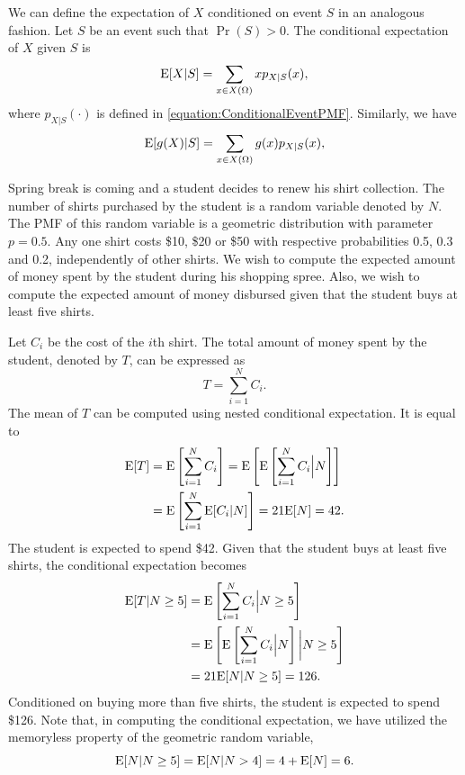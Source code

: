 We can define the expectation of $X$ conditioned on event $S$ in an analogous fashion.
Let $S$ be an event such that $\Pr (S) > 0$.
The conditional expectation of $X$ given $S$ is
\begin{equation*}
\mathrm{E} [X | S] = \sum_{x \in X(\Omega)} x p_{X|S} (x) ,
\end{equation*}
where $p_{X|S} (\cdot)$ is defined in \eqref{equation:ConditionalEventPMF}.
Similarly, we have
\begin{equation*}
\mathrm{E} [g(X) | S] = \sum_{x \in X(\Omega)} g(x) p_{X|S} (x) ,
\end{equation*}

\begin{example}
Spring break is coming and a student decides to renew his shirt collection.
The number of shirts purchased by the student is a random variable denoted by $N$.
The PMF of this random variable is a geometric distribution with parameter $p = 0.5$.
Any one shirt costs \$10, \$20 or \$50 with respective probabilities 0.5, 0.3 and 0.2, independently of other shirts.
We wish to compute the expected amount of money spent by the student during his shopping spree.
Also, we wish to compute the expected amount of money disbursed given that the student buys at least five shirts.

Let $C_i$ be the cost of the $i$th shirt.
The total amount of money spent by the student, denoted by $T$, can be expressed as
\begin{equation*}
T = \sum_{i=1}^N C_i .
\end{equation*}
The mean of $T$ can be computed using nested conditional expectation.
It is equal to
\begin{equation*}
\begin{split}
\mathrm{E} [T] &= \mathrm{E} \left[ \sum_{i=1}^N C_i \right]
= \mathrm{E} \left[ \mathrm{E} \left[
\sum_{i=1}^N C_i \Big| N \right] \right] \\
&= \mathrm{E} \left[ \sum_{i=1}^N \mathrm{E} [ C_i | N ] \right]
= 21 \mathrm{E} [ N ] = 42.
\end{split}
\end{equation*}
The student is expected to spend \$42.
Given that the student buys at least five shirts, the conditional expectation becomes
\begin{equation*}
\begin{split}
\mathrm{E} [T | N \geq 5]
&= \mathrm{E} \left[ \sum_{i=1}^N C_i \Big| N \geq 5 \right] \\
&= \mathrm{E} \left[ \mathrm{E} \left[
\sum_{i=1}^N C_i \Big| N \right] \bigg| N \geq 5 \right] \\
&= 21 \mathrm{E} [ N | N \geq 5]
= 126 .
\end{split}
\end{equation*}
Conditioned on buying more than five shirts, the student is expected to spend \$126.
Note that, in computing the conditional expectation, we have utilized the memoryless property of the geometric random variable,
\begin{equation*}
\mathrm{E} [ N | N \geq 5] = \mathrm{E} [ N | N > 4] = 4 + \mathrm{E} [ N ] = 6 .
\end{equation*}
\end{example}


